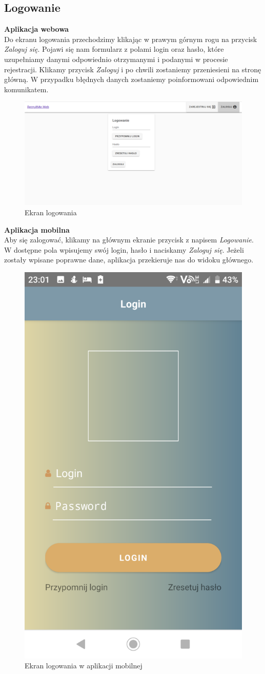 \documentclass{article}
\begin{document}
\subsection{Logowanie} 

\textbf{Aplikacja webowa} \\
Do ekranu logowania przechodzimy klikając w prawym górnym rogu na przycisk \emph{Zaloguj się}. Pojawi się nam formularz z polami login oraz hasło, które uzupełniamy danymi odpowiednio otrzymanymi i podanymi w procesie rejestracji.
Klikamy przycisk \emph{Zaloguj} i po chwili zostaniemy przeniesieni na stronę główną. W przypadku błędnych danych zostaniemy poinformowani odpowiednim komunikatem.
\begin{figure}[H]
    \centering
    \includegraphics[width=1\linewidth]{images/web/login.png}
    \caption{Ekran logowania}
    \label{fig:test3_label}
\end{figure}

\textbf{Aplikacja mobilna} \\
Aby się zalogować, klikamy na głównym ekranie przycisk z napisem \emph{Logowanie}. W dostępne pola wpisujemy swój login, hasło i naciskamy \emph{Zaloguj się}. Jeżeli zostały wpisane poprawne dane, aplikacja przekieruje nas do widoku głównego.

\begin{figure}[H]
    \centering
    \includegraphics[width=0.45\linewidth]{images/mobile/login.png}
    \caption{Ekran logowania w aplikacji mobilnej}
    \label{fig:test3_label}
\end{figure}
\end{document}
